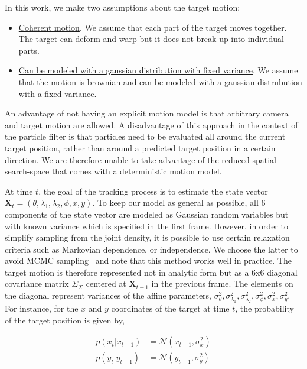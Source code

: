 \begin{Body}
In this work, we make two assumptions about the target motion:

\begin{itemize}
\item \underline{Coherent motion}.  We assume that each part of the target moves together.  The target can deform and warp but it does not break up into individual parts.
\item \underline{Can be modeled with a gaussian distribution with fixed variance}.  We assume that the motion is brownian and can be modeled with a gaussian distrubution with a fixed variance.  
\end{itemize}

An advantage of not having an explicit motion model is that arbitrary camera and target motion are allowed.  A disadvantage of this approach in the context of the particle filter is that particles need to be evaluated all around the current target position, rather than around a predicted target position in a certain direction.  We are therefore unable to take advantage of the reduced spatial search-space that comes with a deterministic motion model.  

At time $t$, the goal of the tracking process is to estimate the state vector $\mathbf{X}_t = (\theta, \lambda_1, \lambda_2, \phi, x, y)$.  To keep our model as general as possible, all 6 components of the state vector are modeled as Gaussian random variables but with known variance which is specified in the first frame.  However, in order to simplify sampling from the joint density, it is possible to use certain relaxation criteria such as Markovian dependence, or independence.  We choose the latter to avoid MCMC sampling~\cite{2009_BOOK_Bayes_Hoff} and note that this method works well in practice.  The target motion is therefore represented not in analytic form but as a 6x6 diagonal covariance matrix $\Sigma_X$ centered at $\mathbf{X}_{t-1}$ in the previous frame.  The elements on the diagonal represent variances of the affine parameters, $\sigma_\theta^2, \sigma_{\lambda_1}^2, \sigma_{\lambda_2}^2, \sigma_\phi^2, \sigma_x^2, \sigma_y^2$.  For instance, for the $x$ and $y$ coordinates of the target at time $t$, the probability of the target position is given by,

\begin{align}
p(x_t|x_{t-1}) &= \mathcal{N}(x_{t-1}, \sigma_x^2) \\
p(y_t|y_{t-1}) &= \mathcal{N}(y_{t-1}, \sigma_y^2)
\end{align}


\end{Body}
